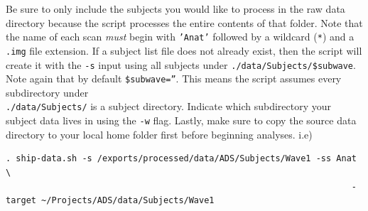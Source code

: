 \documentclass[paper=a4, fontsize=11pt]{scrartcl} %
\numberwithin{equation}{section} %
\numberwithin{figure}{section} %
\numberwithin{table}{section} %
\begin{document}
Be sure to only include the subjects you would like to process in the raw data directory because the script processes the entire contents of that folder. Note that the name of each scan \textit{must} begin with \texttt{'Anat'} followed by a wildcard (\texttt{*}) and a \texttt{.img} file extension. If a subject list file does not already exist, then the script will create it with the \texttt{-s} input using all subjects under \texttt{./data/Subjects/\$subwave}. Note again that by default \texttt{\$subwave=''}. This means the script assumes every subdirectory under 
\\ \texttt{./data/Subjects/} is a subject directory.  Indicate which subdirectory your subject data lives in using the \texttt{-w} flag. Lastly, make sure to copy the source data directory to your local home folder first before beginning analyses.  i.e)
\begin{lstlisting}
. ship-data.sh -s /exports/processed/data/ADS/Subjects/Wave1 -ss Anat \
																	-target ~/Projects/ADS/data/Subjects/Wave1
\end{lstlisting}
\end{document}
